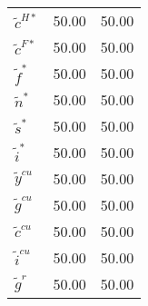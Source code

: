 \begin{center}
\begin{longtable}{lcc}
${\tilde c^{H*}}       $	 & 	             50.00	 & 	             50.00 \\ 
${\tilde c^{F*}}       $	 & 	             50.00	 & 	             50.00 \\ 
${\tilde f^*}          $	 & 	             50.00	 & 	             50.00 \\ 
${\tilde n^*}          $	 & 	             50.00	 & 	             50.00 \\ 
${\tilde s^*}          $	 & 	             50.00	 & 	             50.00 \\ 
${\tilde i^*}          $	 & 	             50.00	 & 	             50.00 \\ 
${\tilde y^{cu}}       $	 & 	             50.00	 & 	             50.00 \\ 
${\tilde g^{cu}}       $	 & 	             50.00	 & 	             50.00 \\ 
${\tilde c^{cu}}       $	 & 	             50.00	 & 	             50.00 \\ 
${\tilde i^{cu}}       $	 & 	             50.00	 & 	             50.00 \\ 
${\tilde g^{r}}        $	 & 	             50.00	 & 	             50.00 \\ 
\end{longtable}
 \end{center}
